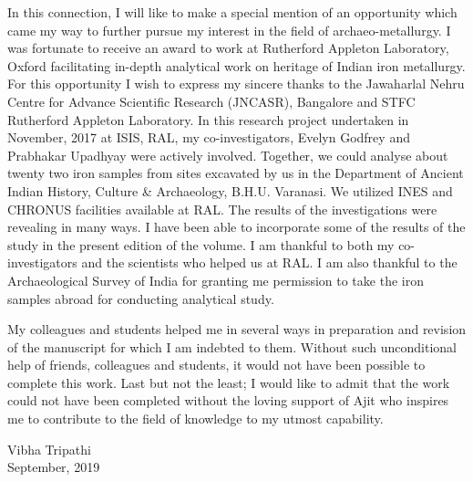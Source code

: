 In this connection, I will like to make a special mention of an opportunity which came my way to further pursue my interest in the field of archaeo-metallurgy. I was fortunate to receive an award to work at Rutherford Appleton Laboratory, Oxford facilitating in-depth analytical work on heritage of Indian iron metallurgy. For this opportunity I wish to express my sincere thanks to the Jawaharlal Nehru Centre for Advance Scientific Research   (JNCASR), Bangalore and   STFC Rutherford Appleton Laboratory.  In this research project undertaken in November, 2017 at ISIS, RAL, my co-investigators, Evelyn Godfrey and Prabhakar Upadhyay were actively involved. Together, we could analyse about twenty two iron samples from sites excavated by us in the Department of Ancient Indian History, Culture \& Archaeology, B.H.U. Varanasi. We utilized INES and CHRONUS facilities available at RAL. The results of the investigations were revealing in many ways. I have been able to incorporate some of the results of the study in the present edition of the volume. I am thankful to both my co-investigators and the scientists who helped us at RAL. I am also thankful to the Archaeological Survey of India for granting me permission to take the iron samples abroad for conducting analytical study. 

My colleagues and students helped me in several ways in preparation and revision of the manuscript for which I am indebted to them. Without such unconditional help of friends, colleagues and students, it would not have been possible to complete this work. Last but not the least; I would like to admit that the work could not have been completed without the loving support of Ajit who inspires me to contribute to the field of knowledge to my utmost capability. 

Vibha Tripathi\\ September, 2019
